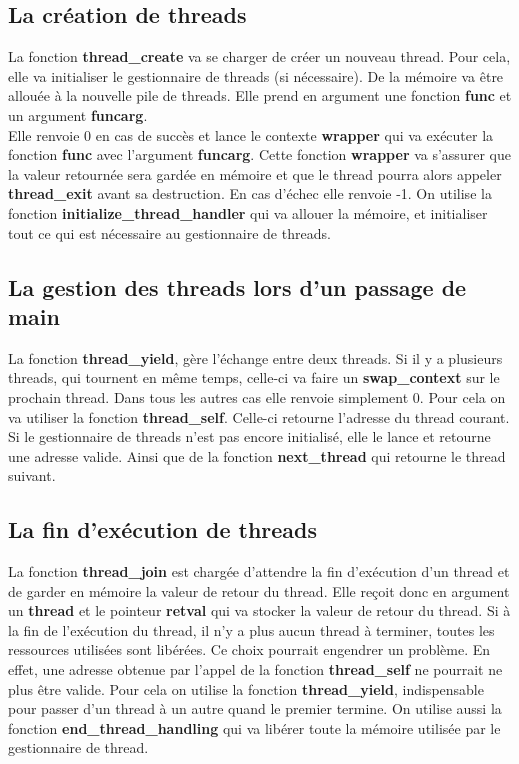 \documentclass{article}
\begin{document}
\subsection{La création de threads}
La fonction \textbf{thread\_create} va se charger de créer un nouveau thread.
Pour cela, elle va initialiser le gestionnaire de threads (si nécessaire). De la
mémoire va être allouée à la nouvelle pile de threads. Elle prend en argument
une fonction \textbf{func} et un argument \textbf{funcarg}.
\\
Elle renvoie 0 en cas de succès et lance le contexte \textbf{wrapper} qui va
exécuter la fonction \textbf{func} avec l'argument \textbf{funcarg}.
Cette fonction \textbf{wrapper} va s'assurer que la valeur retournée sera gardée
en mémoire et que le thread pourra alors appeler \textbf{thread\_exit} avant sa
destruction.
En cas d'échec elle renvoie -1.
On utilise la fonction \textbf{initialize\_thread\_handler} qui va allouer la
mémoire, et initialiser tout ce qui est nécessaire au gestionnaire de threads.

\subsection{La gestion des threads lors d'un passage de main}
La fonction \textbf{thread\_yield}, gère l'échange entre deux threads.
Si il y a plusieurs threads, qui tournent en même temps, celle-ci va faire un
\textbf{swap\_context} sur le prochain thread.
Dans tous les autres cas elle renvoie simplement 0.
Pour cela on va utiliser la fonction \textbf{thread\_self}.
Celle-ci retourne l'adresse du thread courant. Si le gestionnaire de threads
n'est pas encore initialisé, elle le lance et retourne une adresse valide.
Ainsi que de la fonction \textbf{next\_thread} qui retourne le thread suivant.

\subsection{La fin d'exécution de threads}
La fonction \textbf{thread\_join} est chargée d'attendre la fin d'exécution
d'un thread et de garder en mémoire la valeur de retour du thread.
Elle reçoit donc en argument un \textbf{thread} et le pointeur \textbf{retval}
qui va stocker la valeur de retour du thread.
Si à la fin de l'exécution du thread, il n'y a plus aucun thread à terminer,
toutes les ressources utilisées sont libérées. Ce choix pourrait engendrer un
problème. En effet, une adresse obtenue par l'appel de la fonction
\textbf{thread\_self} ne pourrait ne plus être valide.
Pour cela on utilise la fonction \textbf{thread\_yield}, indispensable pour
passer d'un thread à un autre quand le premier termine.
On utilise aussi la fonction \textbf{end\_thread\_handling} qui va libérer
toute la mémoire utilisée par le gestionnaire de thread.
\end{document}
